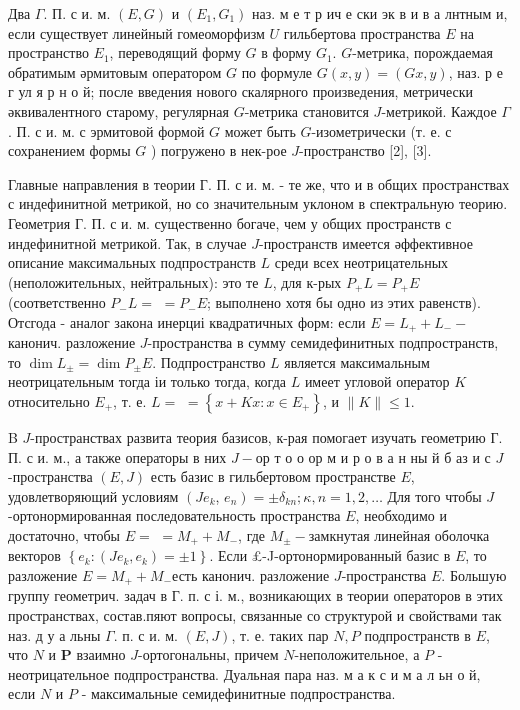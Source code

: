 \documentclass[10pt]{article}
\begin{document}
Два $\Gamma$. П. с и. м. $(E, G)$ и $\left(E_{1}, G_{1}\right)$ наз. м е т р ич е ски эк в и в а лнтным и, если существует линейный гомеоморфизм $U$ гильбертова пространства $E$ на пространство $E_{1}$, переводящий форму $G$ в форму $G_{1}$. $G$-метрика, порождаемая обратимым әрмитовым оператором $G$ по формуле $G(x, y)=(G x, y)$, наз. р е г ул я р н о й; после введения нового скалярного произведения, метрически әквивалентного старому, регулярная $G$-метрика становится $J$-метрикой. Каждое $\Gamma$. П. с и. м. с эрмитовой формой $G$ может быть $G$-изометрически (т. е. с сохранением формы $G$ ) погружено в нек-рое $J$-пространство [2], [3].



Главные направления в теории Г. П. с и. м. - те же, что и в общих пространствах с индефинитной метрикой, но со значительным уклоном в спектральную теорию. Геометрия Г. П. с и. м. существенно богаче, чем у общих пространств с индефинитной метрикой. Так, в случае $J$-пространств имеется әффективное описание максимальных подпространств $L$ среди всех неотрицательных (неположительных, нейтральных): это те $L$, для к-рых $P_{+} L=P_{+} E$ (соответственно $P_{-} L=$ $=P_{-} E$; выполнено хотя бы одно из этих равенств). Отсгода - аналог закона инерциі квадратичных форм: если $E=L_{+}+L_{-}-$канонич. разложение $J$-пространства в сумму семидефинитных подпространств, то $\operatorname{dim} L_{ \pm}=\operatorname{dim} P_{ \pm} E$. Подпространство $L$ является максимальным неотрицательным тогда іи только тогда, когда $L$ имеет угловой оператор $K$ относительно $E_{+}$, т. е. $L=$ $=\left\{x+K x: x \in E_{+}\right\}$, и $\|K\| \leqslant 1$.



B $J$-пространствах развита теория базисов, к-рая помогает изучать геометрию Г. П. с и. м., а также операторы в них $J-о р$ т о о ор м и р о в а н ны й б аз и с $J$-пространства $(E, J)$ есть базис в гильбертовом пространстве $E$, удовлетворяющий условиям $\left(J e_{k}\right.$, $\left.e_{n}\right)= \pm \delta_{k n} ; \kappa, n=1,2, \ldots$ Для того чтобы $J$-ортонормированная последовательность пространства $E$, необходимо и достаточно, чтобы $E=$ $=M_{+}+M_{-}$, где $M_{ \pm}-$замкнутая линейная оболочка векторов $\left\{e_{k}:\left(J e_{k}, e_{k}\right)= \pm 1\right\}$. Если £-J-ортонормированный базис в $E$, то разложение $E=M_{+}+M_{-}$есть канонич. разложение $J$-пространства $E$. Большую группу геометрич. задач в Г. п. с і. м., возникающих в теории операторов в этих пространствах, состав.пяют вопросы, связанные со структурой и свойствами так наз. д у а льны $\Gamma$. п. с и. м. $(E, J)$, т. е. таких пар $N, P$ подпространств в $E$, что $N$ и $\boldsymbol{P}$ взаимно $J$-ортогональны, причем $N$-неположительное, а $P$ - неотрицательное подпространства. Дуальная пара наз. м а к с и м а л ьн о й, если $N$ и $P$ - максимальные семидефинитные подпространства.
\end{document}
